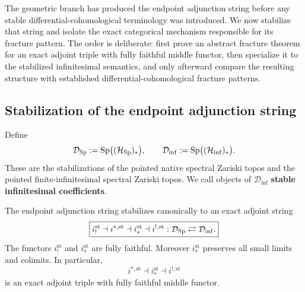 The geometric branch has produced the endpoint adjunction string before any
stable differential-cohomological terminology was introduced. We now
stabilize that string and isolate the exact categorical mechanism responsible
for its fracture pattern. The order is deliberate: first prove an abstract
fracture theorem for an exact adjoint triple with fully faithful middle
functor, then specialize it to the stabilized infinitesimal semantics, and
only afterward compare the resulting structure with established
differential-cohomological fracture patterns.

\subsection{Stabilization of the endpoint adjunction string}

\begin{definition}
\label{def:stable-native-infinitesimal-categories}
Define
\[
    \mathcal D_{\operatorname{Sp}}
    :=
    \operatorname{Sp}\bigl((\mathcal H_{\operatorname{Sp}})_*\bigr),
    \qquad
    \mathcal D_{\inf}
    :=
    \operatorname{Sp}\bigl((\mathcal H_{\inf})_*\bigr).
\]
These are the stabilizations of the pointed native spectral Zariski topos and
the pointed finite-infinitesimal spectral Zariski topos. We call objects of
\(\mathcal D_{\inf}\) \textbf{stable infinitesimal coefficients}.
\end{definition}

\begin{theorem}
\label{thm:stable-bnv-adjoint-string}
The endpoint adjunction string stabilizes canonically to an exact adjoint
string
\[
\boxed{
    i_!^{\mathrm{st}}
    \dashv
    i^{*,\mathrm{st}}
    \dashv
    i_*^{\mathrm{st}}
    \dashv
    i^{!,\mathrm{st}}
    :
    \mathcal D_{\operatorname{Sp}}
    \rightleftarrows
    \mathcal D_{\inf}.
}
\]
The functors \(i_!^{\mathrm{st}}\) and \(i_*^{\mathrm{st}}\) are fully
faithful. Moreover \(i_*^{\mathrm{st}}\) preserves all small limits and
colimits. In particular,
\[
\boxed{
    i^{*,\mathrm{st}}
    \dashv
    i_*^{\mathrm{st}}
    \dashv
    i^{!,\mathrm{st}}
}
\]
is an exact adjoint triple with fully faithful middle functor.
\end{theorem}

